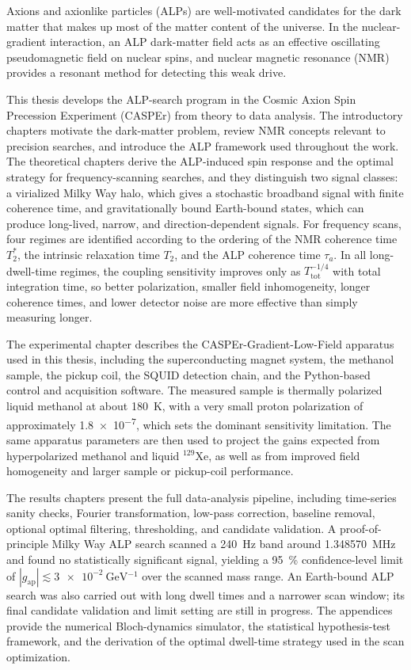 
Axions and axionlike particles (ALPs) are well-motivated candidates for the dark matter that makes up most of the matter content of the universe.
In the nuclear-gradient interaction, an ALP dark-matter field acts as an effective oscillating pseudomagnetic field on nuclear spins, and nuclear magnetic resonance (NMR) provides a resonant method for detecting this weak drive.

This thesis develops the ALP-search program in the Cosmic Axion Spin Precession Experiment (CASPEr) from theory to data analysis.
The introductory chapters motivate the dark-matter problem, review NMR concepts relevant to precision searches, and introduce the ALP framework used throughout the work.
The theoretical chapters derive the ALP-induced spin response and the optimal strategy for frequency-scanning searches, and they distinguish two signal classes: a virialized Milky Way halo, which gives a stochastic broadband signal with finite coherence time, and gravitationally bound Earth-bound states, which can produce long-lived, narrow, and direction-dependent signals.
For frequency scans, four regimes are identified according to the ordering of the NMR coherence time $T_2^*$, the intrinsic relaxation time $T_2$, and the ALP coherence time $\tau_a$.
In all long-dwell-time regimes, the coupling sensitivity improves only as $T_\mathrm{tot}^{-1/4}$ with total integration time, so better polarization, smaller field inhomogeneity, longer coherence times, and lower detector noise are more effective than simply measuring longer.

The experimental chapter describes the CASPEr-Gradient-Low-Field apparatus used in this thesis, including the superconducting magnet system, the methanol sample, the pickup coil, the SQUID detection chain, and the Python-based control and acquisition software.
The measured sample is thermally polarized liquid methanol at about \SI{180}{\kelvin}, with a very small proton polarization of approximately \SI{1.8e-7}{}, which sets the dominant sensitivity limitation.
The same apparatus parameters are then used to project the gains expected from hyperpolarized methanol and liquid ${}^{129}$Xe, as well as from improved field homogeneity and larger sample or pickup-coil performance.

The results chapters present the full data-analysis pipeline, including time-series sanity checks, Fourier transformation, low-pass correction, baseline removal, optional optimal filtering, thresholding, and candidate validation.
A proof-of-principle Milky Way ALP search scanned a \SI{240}{\Hz} band around \SI{1.348570}{\MHz} and found no statistically significant signal, yielding a \SI{95}{\percent} confidence-level limit of $|g_\mathrm{ap}| \lesssim \SI{3e-2}{\GeV^{-1}}$ over the scanned mass range.
An Earth-bound ALP search was also carried out with long dwell times and a narrower scan window; its final candidate validation and limit setting are still in progress.
The appendices provide the numerical Bloch-dynamics simulator, the statistical hypothesis-test framework, and the derivation of the optimal dwell-time strategy used in the scan optimization.

